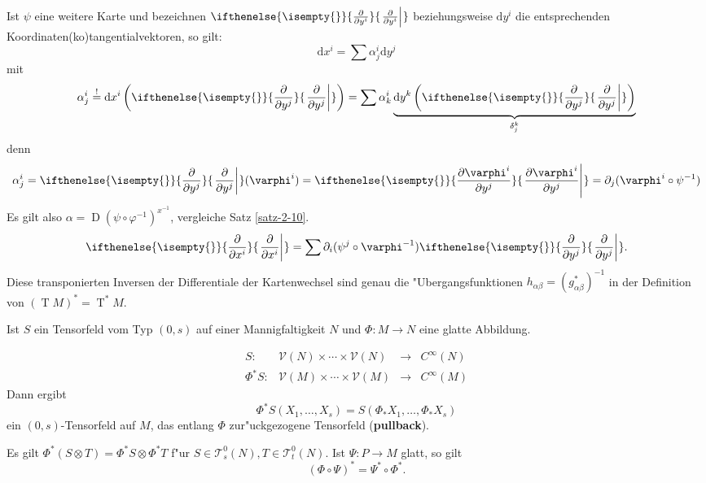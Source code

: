 \documentclass[paper=A4, twoside, chapterprefix=true, bibliography=totoc, headsepline]{scrbook}
\let\temp\phi{}
\let\phi\varphi{}
\let\varphi\temp{}
\let\temp\theta{}
\let\theta\vartheta{}
\let\vartheta\temp{}
\let\temp\epsilon{}
\let\epsilon\varepsilon{}
\let\varepsilon\temp{}
\let\temp\rho{}
\let\rho\varrho{}
\let\varrho\temp{}
\DeclareMathOperator{\calT}{\mathcal{T}}
\DeclareMathOperator{\D}{D}         %
\DeclareMathOperator{\T}{T}         %
\newcommand{\dop}{\mathrm{d}}
\newcommand{\X}{\times}
\newcommand{\pdifffrac}[3][]{\ifthenelse{\isempty{#1}}{\frac{\partial #2}{\partial #3}}{\left. \frac{\partial #2}{\partial #3} \right|_{#1}}}
\theoremstyle{plain}
\theoremstyle{nonumberplain}
\theoremstyle{empty}
\theoremstyle{break}
\newcommand{\CmIndex}[2][]{\ifthenelse{\isempty{#1}}{\index{#2}}{\index{#1}}#2}
\newcommand{\CmMark}[2][]{\textbf{\CmIndex[#1]{#2}}}
\begin{document}
Ist $\psi$ eine weitere Karte und bezeichnen $\pdifffrac{}{y^i}$ beziehungsweise $\dop y^i$ die entsprechenden Koordinaten(ko)tangentialvektoren, so gilt:
	\[ \dop x^i = \sum \alpha_j^i\dop y^j \]
mit
	\[ \alpha_j^i \overset{!}{=} \dop x^i\left(\pdifffrac{}{y^j}\right) = \sum \alpha_k^i \underbrace{\dop y^k\left(\pdifffrac{}{y^j}\right)}_{\delta_j^k} \]
denn
	\[ \alpha_j^i = \pdifffrac{}{y^j}(\phi^i) = \pdifffrac{\phi^i}{y^j} = \partial_j(\phi^i\circ \psi^{-1}) \]
Es gilt also $\alpha = \D(\psi \circ \phi^{-1})^{x^{-1}}$, vergleiche Satz \ref{satz-2-10}.
\begin{align*}
  \pdifffrac{}{x^i} = \sum \partial_i (\psi^j \circ \phi^{-1})\pdifffrac{}{y^j}.
\end{align*}
Diese transponierten Inversen der Differentiale der Kartenwechsel sind genau die "Ubergangsfunktionen $h_{\alpha\beta} = (g_{\alpha\beta}^{*})^{-1}$ in der Definition von $(\T M)^{*} = \T^{*}M$.

Ist $S$ ein Tensorfeld vom Typ $(0,s)$ auf einer Mannigfaltigkeit $N$ und $\Phi \colon M \to N$ eine glatte Abbildung.
\begin{center}\end{center}
	\[ \begin{array}{rccc} S \colon & \mathcal V(N) \X \cdots \X \mathcal V(N) &\to& C^{\infty}(N)\\
		\Phi^{*}S \colon & \mathcal V(M) \X \cdots \X \mathcal V(M) &\to& C^{\infty}(M) \end{array} \]
Dann ergibt
	\[ \Phi^{*}S(X_{1},\ldots,X_{s}) = S(\Phi_{*}X_{1},\ldots,\Phi_{*}X_{s}) \]
ein $(0,s)$-Tensorfeld auf $M$, das entlang $\Phi$ zur"uckgezogene Tensorfeld (\CmMark{pullback}).

Es gilt $\Phi^{*}(S \otimes T) = \Phi^{*}S \otimes \Phi^{*}T$ f"ur $S \in \mathcal T_s^0(N), T \in \mathcal T_t^0(N)$.
Ist $\Psi \colon P \to M$ glatt, so gilt
	\[ (\Phi \circ \Psi)^{*} = \Psi^{*} \circ \Phi^{*}.\]
\end{document}
